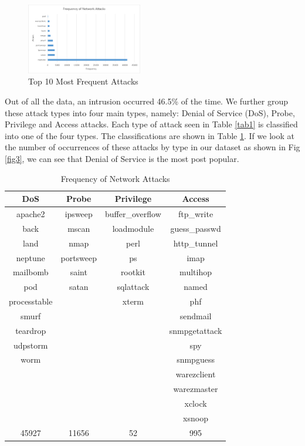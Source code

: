 \documentclass[conference]{IEEEtran}
\begin{document}
\begin{figure}[!h]
\centerline{\includegraphics[height= 170 pt, width=0.45\textwidth]{External/Fig-Frequency-of-Attacks.PNG}}
\caption{Top 10 Most Frequent Attacks}
\label{fig2}
\end{figure}

Out of all the data, an intrusion occurred 46.5\% of the time. We further group these attack types into four main types, namely: Denial of Service (DoS), Probe, Privilege and Access attacks. Each type of attack seen in Table \ref{tab1} is classified into one of the four types. The classifications are shown in Table \ref{tab2}. If we look at the number of occurrences of these attacks by type in our dataset as shown in Fig \ref{fig3}, we can see that Denial of Service is the most post popular.

\begin{table}[htbp]
\caption{Frequency of Network Attacks}
\begin{center}
\begin{tabular}{|c|c|c|c|}
\hline
DoS	&	Probe	&	Privilege	&	Access	\\
\hline
apache2	&	ipsweep	&	buffer\_overflow	&	ftp\_write	\\
back	&	mscan	&	loadmodule	&	guess\_passwd	\\
land	&	nmap	&	perl	&	http\_tunnel	\\
neptune	&	portsweep	&	ps	&	imap	\\
mailbomb	&	saint	&	rootkit	&	multihop	\\
pod	&	satan	&	sqlattack	&	named	\\
processtable	&		&	xterm	&	phf	\\
smurf	&		&		&	sendmail	\\
teardrop	&		&		&	snmpgetattack	\\
udpstorm	&		&		&	spy	\\
worm	&		&		&	snmpguess	\\
	&		&		&	warezclient	\\
	&		&		&	warezmaster	\\
	&		&		&	xclock	\\
	&		&		&	xsnoop	\\
\hline
45927 &	 11656  &	 52  &	995
	\\
\hline
\end{tabular}
\label{tab2}
\end{center}
\end{table}
\end{document}
